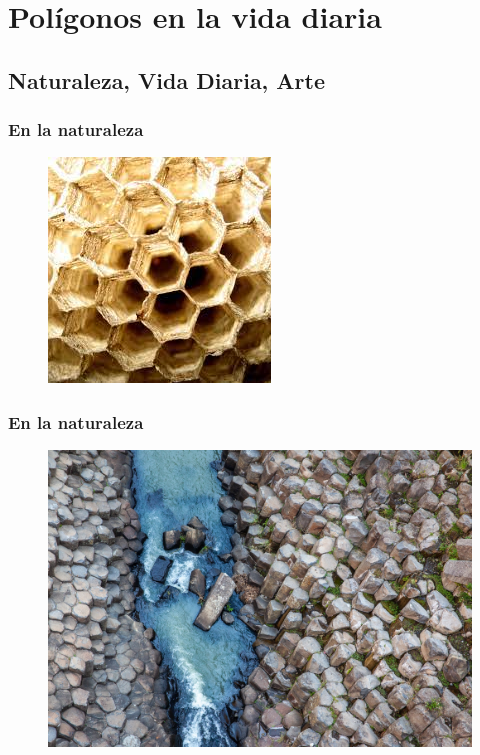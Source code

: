 \documentclass[14pt]{beamer}
\begin{document}
\section{Polígonos en la vida diaria}
\subsection{Naturaleza, Vida Diaria, Arte}

\begin{frame}
\frametitle{En la naturaleza}
\begin{figure}
    \centering
    \includegraphics[scale=0.8]{Imagenes/Panel_Abejas_Hexagonal.jpg}
\end{figure}
\end{frame}
\begin{frame}
\frametitle{En la naturaleza}
\begin{figure}
    \centering
    \includegraphics[scale=0.25]{Imagenes/Prismas_Basalticos.jpg}
\end{figure}
\end{frame}
\end{document}
